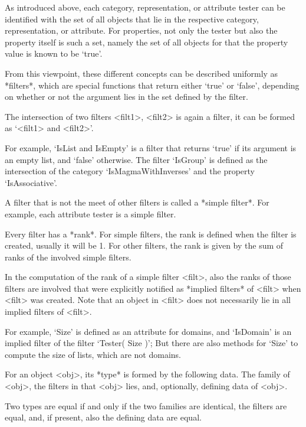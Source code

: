 As introduced above, each category, representation, or attribute tester
can be identified with the set of all objects that lie in the respective
category, representation, or attribute.
For properties, not only the tester but also the property itself is such
a set,
namely the set of all objects for that the property value is known to be
`true'.

{}From this viewpoint, these different concepts can be described
uniformly as *filters*,
which are special {\GAP} functions that return either `true' or `false',
depending on whether or not the argument lies in the set defined by the
filter.

The intersection of two filters <filt1>, <filt2> is again a filter,
it can be formed as `<filt1> and <filt2>'.

For example, `IsList and IsEmpty' is a filter that returns `true'
if its argument is an empty list, and `false' otherwise.
The filter `IsGroup' is defined as the intersection of the category
`IsMagmaWithInverses' and the property `IsAssociative'.

A filter that is not the meet of other filters
is called a *simple filter*.
For example, each attribute tester is a simple filter.

Every filter has a *rank*.
For simple filters, the rank is defined when the filter is created,
usually it will be 1.
For other filters, the rank is given by the sum of ranks of the involved
simple filters.

In the computation of the rank of a simple filter <filt>,
also the ranks of those filters are involved that were
explicitly notified as *implied filters* of <filt> when <filt> was
created.
Note that an object in <filt> does not necessarily lie in all
implied filters of <filt>.

For example, `Size' is defined as an attribute for domains,
and `IsDomain' is an implied filter of the filter `Tester( Size )';
But there are also methods for `Size' to compute the size of lists,
which are not domains.


For an object <obj>, its *type* is formed by the following data.
The family of <obj>,
the filters in that <obj> lies,
and, optionally, defining data of <obj>.

Two types are equal if and only if the two families are identical,
the filters are equal, and, if present, also the defining data are equal.

